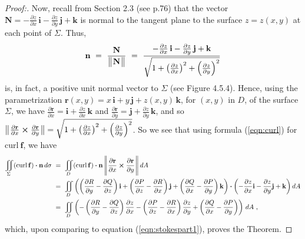 \begin{proofbar}
\begin{proof}[Proof:]
 Now, recall from Section 2.3 (see p.76) that the vector $\mathbf{N} = -\frac{\partial z}{\partial x}\,\mathbf{i} -
 \frac{\partial z}{\partial y}\,\mathbf{j} + \mathbf{k}$ is normal to the tangent plane to the surface $z=z(x,y)$ at
 each point of $\Sigma$. Thus,
 \begin{displaymath}
  \mathbf{n} ~=~ \frac{\mathbf{N}}{\bigl\lVert\mspace{1mu}\mathbf{N}\mspace{1mu}\bigr\rVert} ~=~
   \frac{-\frac{\partial z}{\partial x}\,\mathbf{i} - \frac{\partial z}{\partial y}\,\mathbf{j} +
   \mathbf{k}}{\sqrt{1 + \left( \tfrac{\partial z}{\partial x} \right)^2 +
   \left( \tfrac{\partial z}{\partial y} \right)^2}}
 \end{displaymath}
 is, in fact, a positive unit normal vector to $\Sigma$ (see Figure 4.5.4). Hence, using the parametrization
 $\mathbf{r}(x,y) = x\,\mathbf{i} + y\,\mathbf{j} + z(x,y)\,\mathbf{k}$, for $(x,y)$ in $D$, of the surface $\Sigma$,
 we have $\frac{\partial \mathbf{r}}{\partial x} = \mathbf{i} + \frac{\partial z}{\partial x}\,\mathbf{k}$ and
 $\frac{\partial \mathbf{r}}{\partial y} = \mathbf{j} + \frac{\partial z}{\partial y}\,\mathbf{k}$, and so
 $\bigl\lVert\mspace{1mu}\frac{\partial \mathbf{r}}{\partial x} \bm{\times} \frac{\partial \mathbf{r}}{\partial y}\mspace{1mu}\bigr\rVert =
   \sqrt{1 + \left( \tfrac{\partial z}{\partial x} \right)^2 + \left( \tfrac{\partial z}{\partial y} \right)^2}$.
 So we see that using formula (\ref{eqn:curl}) for $\text{curl}~{\mathbf{f}}$, we have
 \begin{align*}
  \iint\limits_{\Sigma} (\mathop{\mathrm{curl}}\nolimits\mathbf{f}) \bm{\cdot} \mathbf{n}\,d\sigma ~&=~
   \iint\limits_{D} (\mathop{\mathrm{curl}}\nolimits\mathbf{f}) \bm{\cdot} \mathbf{n}\,
   \Biggl\lVert\mspace{1mu}\frac{\partial \mathbf{r}}{\partial x} \bm{\times} \frac{\partial \mathbf{r}}{\partial y}\mspace{1mu}\Biggr\rVert\,dA\\
   &=~ \iint\limits_{D} \left( \left( \frac{\partial R}{\partial y} - \frac{\partial Q}{\partial z} \right)
    \mathbf{i} + \left( \frac{\partial P}{\partial z} - \frac{\partial R}{\partial x} \right) \mathbf{j} +
    \left( \frac{\partial Q}{\partial x} - \frac{\partial P}{\partial y} \right) \mathbf{k}
    \right) \bm{\cdot} \left( -\frac{\partial z}{\partial x}\mathbf{i} - \frac{\partial z}{\partial y}\mathbf{j} +
    \mathbf{k} \right) dA\\
   &=~ \iint\limits_{D} \left(
    -\left( \frac{\partial R}{\partial y} - \frac{\partial Q}{\partial z} \right) \frac{\partial z}{\partial x}
    -\left( \frac{\partial P}{\partial z} - \frac{\partial R}{\partial x} \right) \frac{\partial z}{\partial y}
    + \left( \frac{\partial Q}{\partial x} - \frac{\partial P}{\partial y} \right) \right)\,dA ~,
 \end{align*}
 which, upon comparing to equation (\ref{eqn:stokespart1}), proves the Theorem.
 
\end{proof}\end{proofbar}

